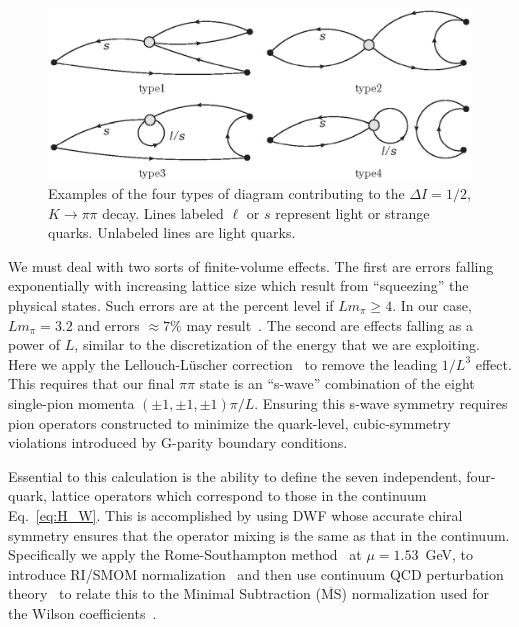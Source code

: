 \documentclass[aps,prl,
superscriptaddress,
showpacs,
preprintnumbers,
bibnotes,
amsmath,
amssymb,
twocolumn,
floatfix,
]{revtex4-1}
\begin{document}
\begin{figure}[htb]
\begin{center}
\includegraphics[width=\linewidth]{diag_types.eps}
\end{center} 
\caption{Examples of the four types of diagram contributing to the $\Delta I=1/2$, $K\to\pi\pi$ decay.  Lines labeled $\ell$ or $s$ represent light or strange quarks.  Unlabeled lines are light quarks.} 
\label{fig:diag_types}
\end{figure}

We must deal with two sorts of finite-volume effects.  The first are errors falling exponentially with increasing lattice size which result from ``squeezing'' the physical states.  Such errors are at the percent level if $L m_\pi \ge 4$.  In our case, $L m_\pi = 3.2$ and errors $\approx7\%$ may result~\cite{Blum:2012uk}.  The second are effects falling as a power of $L$, similar to the discretization of the energy that we are exploiting.  Here we apply the Lellouch-L\"uscher correction~\cite{Lellouch:2000pv} to remove the leading $1/L^3$ effect.  This requires that our final $\pi\pi$ state is an ``s-wave'' combination of the eight single-pion momenta $(\pm 1,\pm 1, \pm 1)\pi/L$.  Ensuring this s-wave symmetry requires pion operators constructed to minimize the quark-level, cubic-symmetry violations introduced by G-parity boundary conditions.

Essential to this calculation is the ability to define the seven independent, four-quark, lattice operators which correspond to those in the continuum Eq.~\eqref{eq:H_W}.  This is accomplished by using DWF whose accurate chiral symmetry ensures that the operator mixing is the same as that in the continuum.     Specifically we apply the Rome-Southampton method~\cite{Martinelli:1994ty} at $\mu = 1.53$~GeV, to introduce RI/SMOM normalization~\cite{Blum:2011pu} and then use continuum QCD perturbation theory~\cite{Lehner:2011fz}  to relate this to the Minimal Subtraction ($\overline{\mathrm{MS}}$) normalization used for the Wilson coefficients~\cite{Buchalla:1995vs}.
\end{document}
